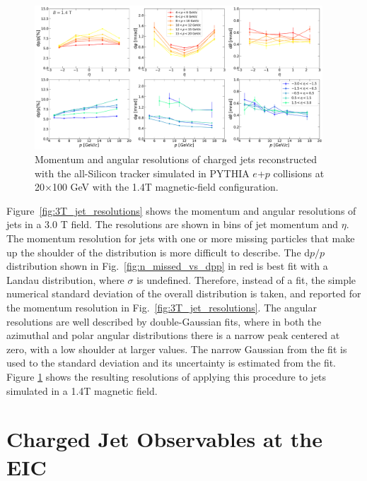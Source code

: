 \begin{figure}[htbp]
    \centering
    \includegraphics[width=0.96\textwidth]{EIC_Jets/DeltaR_B_1.4_resolutions_eta_mom.pdf}
    \caption{Momentum and angular resolutions of charged jets reconstructed with the all-Silicon tracker simulated in PYTHIA $e$+$p$ collisions at 20$\times$100 GeV with the 1.4T magnetic-field configuration.}
    \label{fig:1p4T_jet_resolutions}
\end{figure}

Figure~\ref{fig:3T_jet_resolutions} shows the momentum and angular resolutions of jets in a 3.0 T field. The resolutions are shown in bins of jet momentum and $\eta$. The momentum resolution for jets with one or more missing particles that make up the shoulder of the distribution is more difficult to describe. The d$p/p$ distribution shown in Fig.~\ref{fig:n_missed_vs_dpp} in red is best fit with a Landau distribution, where $\sigma$ is undefined. Therefore, instead of a fit, the simple numerical standard deviation of the overall distribution is taken, and reported for the momentum resolution in Fig.~\ref{fig:3T_jet_resolutions}. The angular resolutions are well described by double-Gaussian fits, where in both the azimuthal and polar angular distributions there is  a narrow peak centered at zero, with a low shoulder at larger values. The narrow Gaussian from the fit  is used to the standard deviation and its uncertainty is estimated from the fit. Figure \ref{fig:1p4T_jet_resolutions} shows the resulting resolutions of applying this procedure to jets simulated in a 1.4T magnetic field.


\section{Charged Jet Observables at the EIC}

